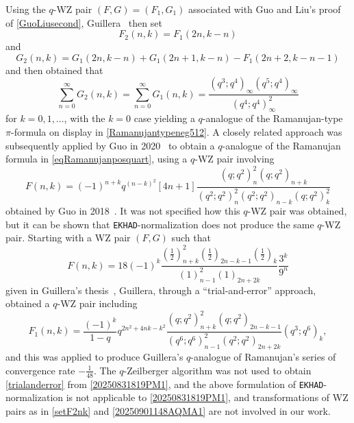 \documentclass[12pt]{article}
\begin{document}
 Using the $q$-WZ pair $(F, G) = (F_1, G_1)$ 
 associated with Guo and Liu's proof of \eqref{GuoLiusecond}, 
 Guillera~\cite{Guillera2018} then set 
\begin{equation}\label{setF2nk}
 F_{2}(n, k) = F_{1}(2n, k - n) 
\end{equation}
 and 
\begin{equation}\label{20250901148AQMA1}
 G_{2}(n, k) = G_{1}(2n, k-n) + G_{1}(2n+1, k-n) -F_{1}(2n+2,k-n-1) 
\end{equation}
 and then obtained that 
 $$ \sum_{n=0}^{\infty} G_{2}(n, k) = \sum_{n=0}^{\infty} G_{1}(n, k) 
 = \frac{ (q^{3}; q^{4})_{\infty} (q^5; q^4)_{\infty} }{ (q^4;q^4)_{\infty}^{2} } $$
 for $k = 0, 1, \ldots$, with the $k = 0$ case yielding
 a $q$-analogue of the Ramanujan-type $\pi$-formula
 on display in \eqref{Ramanujantypeneg512}. 
 A closely related approach was subsequently applied by Guo in 2020~\cite{Guo2020} 
 to obtain a $q$-analogue of the Ramanujan formula in \eqref{eqRamanujanposquart}, 
 using a $q$-WZ pair involving 
 $$ F(n, k) = (-1)^{n+k} q^{(n-k)^{2}} [4n+1] 
 \frac{ (q;q^2)_{n}^{2} (q;q^2)_{n+k} }{ (q^2;q^2)_{n}^{2} 
 (q^2;q^2)_{n-k} (q;q^2)_{k}^2 } $$
 obtained by Guo in 2018~\cite{Guo2018central}. It was not specified
 how this $q$-WZ pair was obtained, 
 but it can be shown that {\tt EKHAD}-normalization 
 does not produce the same $q$-WZ pair. 
 Starting with a WZ pair $(F, G)$ such that 
\begin{equation}\label{20250831819PM1}
 F(n, k) = 18 (-1)^{k} \frac{ \left( \frac{1}{2} \right)_{n+k}^{2} 
 \left( \frac{1}{2} \right)_{2n - k - 1} \left( \frac{1}{2} \right)_{k} }{ 
 (1)_{n-1}^{2} (1)_{2n + 2k} } \frac{3^k}{9^n} 
\end{equation}
 given in Guillera's thesis~\cite[p.\ 28]{Guillera2007}, Guillera, through a ``trial-and-error''
 approach, obtained a $q$-WZ pair including 
\begin{equation}\label{trialanderror}
 F_{1}(n, k) 
 = \frac{(-1)^{k}}{1-q} q^{2n^2 + 4 n k - k^2} \frac{ (q;q^2)_{n+k}^2 (q;q^2)_{2n-k-1} }{ 
 (q^6;q^6)_{n-1}^{2} (q^2;q^2)_{2n+2k} } (q^3;q^6)_{k}, 
\end{equation} 
 and this was applied to produce Guillera's $q$-analogue of Ramanujan's series
 of convergence rate 	 $-\frac{1}{48}$. 
 The $q$-Zeilberger algorithm
 was not used to obtain \eqref{trialanderror} from 
 \eqref{20250831819PM1}, and the above formulation of {\tt EKHAD}-normalization is not applicable
 to \eqref{20250831819PM1}, 
 and transformations of WZ pairs as in \eqref{setF2nk}
 and \eqref{20250901148AQMA1} are not involved in our work. 
\end{document}
